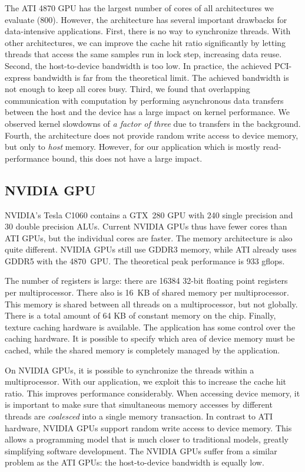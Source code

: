 \documentclass{article}
\begin{document}
The ATI 4870 GPU has the largest number of cores of all architectures
we evaluate (800).  However, the architecture has several important
drawbacks for data-intensive applications.  First, there is no way to
synchronize threads. With other architectures, we can improve the
cache hit ratio significantly by letting threads that access the same
samples run in lock step, increasing data reuse.  Second, the
host-to-device bandwidth is too low. In practice, the achieved
PCI-express bandwidth is far from the theoretical limit. The achieved
bandwidth is not enough to keep all cores busy.  Third, we found that
overlapping communication with computation by performing asynchronous
data transfers between the host and the device has a large impact on
kernel performance. We observed kernel slowdowns of \emph{a factor of
  three} due to transfers in the background.  Fourth, the architecture
does not provide random write access to device memory, but only to
\emph{host} memory. However, for our application which is mostly
read-performance bound, this does not have a large impact.


\subsection{NVIDIA GPU}

NVIDIA's Tesla C1060 contains a GTX~280 GPU with 240 single precision
and 30 double precision ALUs.  Current NVIDIA GPUs thus have fewer
cores than ATI GPUs, but the individual cores are faster. The memory
architecture is also quite different. NVIDIA GPUs still use GDDR3
memory, while ATI already uses GDDR5 with the 4870~GPU.  The
theoretical peak performance is 933 gflops.

The number of registers is large: there are 16384 32-bit floating
point registers per multiprocessor. There also is 16~KB of shared
memory per multiprocessor.  This memory is shared between all threads
on a multiprocessor, but not globally.  There is a total amount of 64
KB of constant memory on the chip.  Finally, texture caching hardware
is available.  The application has some control over the caching
hardware.  It is possible to specify which area of device memory must
be cached, while the shared memory is completely managed by the
application.

On NVIDIA GPUs, it is possible to synchronize the threads within a
multiprocessor.  With our application, we exploit this to increase the
cache hit ratio. This improves performance considerably.  When
accessing device memory, it is important to make sure that
simultaneous memory accesses by different threads are \emph{coalesced}
into a single memory transaction.  In contrast to ATI hardware, NVIDIA
GPUs support random write access to device memory. This allows a
programming model that is much closer to traditional models, greatly
simplifying software development.  The NVIDIA GPUs suffer from a
similar problem as the ATI GPUs: the host-to-device bandwidth is
equally low.
\end{document}
